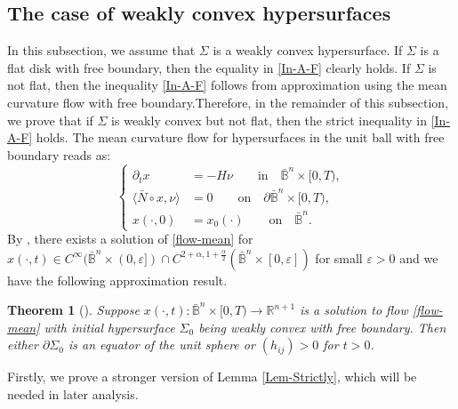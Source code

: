 \documentclass[11pt,reqno]{amsart}
\newtheorem{thm}{Theorem}[section]
\theoremstyle{definition}
\theoremstyle{remark}
\numberwithin{equation}{section}
\renewcommand{\(}{\left(}
\renewcommand{\)}{\right)}
\renewcommand{\-}{\overline}
\begin{document}
\subsection{The case of weakly convex hypersurfaces} In this subsection, we assume that $\Sigma$ is a weakly convex hypersurface. If $\Sigma$ is a flat disk with free boundary, then the equality in \eqref{In-A-F} clearly holds. If $\Sigma$ is not flat, then the inequality \eqref{In-A-F} follows from approximation using the mean curvature flow with free boundary.Therefore, in the remainder of this subsection, we prove that if $\Sigma$ is weakly convex but not flat, then the strict inequality in \eqref{In-A-F}  holds. The mean curvature flow for hypersurfaces in the unit ball with free boundary reads as:
\begin{equation}\label{flow-mean}
	\left\{\begin{aligned}
		\partial_t x&=-H\nu \qquad \text{in}\quad \bar{\mathbb{B}}^n \times[0,T),\\
		\langle\bar{N}\circ x,\nu\rangle&=0 \qquad \text{on}\quad \partial\bar{\mathbb{B}}^n \times[0,T),\\
		x(\cdot,0)&=x_0(\cdot) \qquad \text{on} \quad \bar{\mathbb{B}}^n.
	\end{aligned}\right.
\end{equation}
By \cite[Theorem 2.1]{Stahl1996-2}, there exists a solution of \eqref{flow-mean} for $x(\cdot,t)\in C^{\infty}(\bar{\mathbb{B}}^n\times(0,\varepsilon])\cap C^{2+\alpha,1+\frac{\alpha}{2}}(\bar{\mathbb{B}}^n\times[0,\varepsilon])$ for small $\varepsilon>0$ and we have the following approximation result.

\begin{thm}[\cite{Lambert-Scheuer2017}]
	Suppose $x(\cdot,t):\bar{\mathbb{B}}^n\times [0,T)\to\mathbb{R}^{n+1}$ is a solution to flow \eqref{flow-mean} with initial hypersurface $\Sigma_0$ being weakly convex with free boundary. Then either $\partial\Sigma_0$ is an equator of the unit sphere or $(h_{ij})>0$ for $t>0$.
\end{thm}

Firstly, we prove a stronger version of Lemma \ref{Lem-Strictly}, which will be needed in later analysis.
\end{document}
